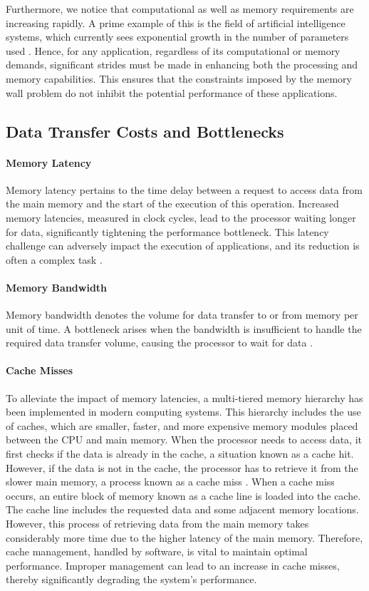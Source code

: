 Furthermore, we notice that computational as well as memory requirements are increasing rapidly. A prime example of this is the field of artificial intelligence systems, which currently sees exponential growth in the number of parameters used \cite{ourworldindata2023ai}. Hence, for any application, regardless of its computational or memory demands, significant strides must be made in enhancing both the processing and memory capabilities. This ensures that the constraints imposed by the memory wall problem do not inhibit the potential performance of these applications.

\subsection{Data Transfer Costs and Bottlenecks}\label{sec:data_transfer}
\paragraph*{Memory Latency} Memory latency pertains to the time delay between a request to access data from the main memory and the start of the execution of this operation. Increased memory latencies, measured in clock cycles, lead to the processor waiting longer for data, significantly tightening the performance bottleneck. This latency challenge can adversely impact the execution of applications, and its reduction is often a complex task \cite{machanick2002approaches}.
\paragraph*{Memory Bandwidth} Memory bandwidth denotes the volume for data transfer to or from memory per unit of time. A bottleneck arises when the bandwidth is insufficient to handle the required data transfer volume, causing the processor to wait for data \cite{machanick2002approaches}.
\paragraph*{Cache Misses}\label{sec:cache_misses} To alleviate the impact of memory latencies, a multi-tiered memory hierarchy has been implemented in modern computing systems. This hierarchy includes the use of caches, which are smaller, faster, and more expensive memory modules placed between the CPU and main memory. When the processor needs to access data, it first checks if the data is already in the cache, a situation known as a cache hit. However, if the data is not in the cache, the processor has to retrieve it from the slower main memory, a process known as a cache miss \cite{efnusheva2017survey, mahapatra1999processor, machanick2002approaches}. When a cache miss occurs, an entire block of memory known as a cache line is loaded into the cache. The cache line includes the requested data and some adjacent memory locations. However, this process of retrieving data from the main memory takes considerably more time due to the higher latency of the main memory. Therefore, cache management, handled by software, is vital to maintain optimal performance. Improper management can lead to an increase in cache misses, thereby significantly degrading the system's performance.

